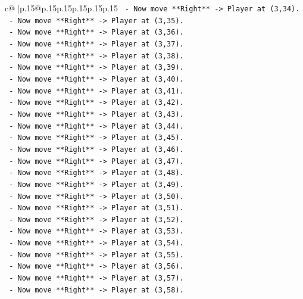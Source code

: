 \documentclass{article}
\begin{document}
{\begin{supertabular}{c@{$\;$}|p{.15\linewidth}@{}p{.15\linewidth}p{.15\linewidth}p{.15\linewidth}p{.15\linewidth}p{.15\linewidth}}
{{{\texttt{    {-}   Now move **Right** {-}> Player at (3,34).} \\
\texttt{    {-}   Now move **Right** {-}> Player at (3,35).} \\
\texttt{    {-}   Now move **Right** {-}> Player at (3,36).} \\
\texttt{    {-}   Now move **Right** {-}> Player at (3,37).} \\
\texttt{    {-}   Now move **Right** {-}> Player at (3,38).} \\
\texttt{    {-}   Now move **Right** {-}> Player at (3,39).} \\
\texttt{    {-}   Now move **Right** {-}> Player at (3,40).} \\
\texttt{    {-}   Now move **Right** {-}> Player at (3,41).} \\
\texttt{    {-}   Now move **Right** {-}> Player at (3,42).} \\
\texttt{    {-}   Now move **Right** {-}> Player at (3,43).} \\
\texttt{    {-}   Now move **Right** {-}> Player at (3,44).} \\
\texttt{    {-}   Now move **Right** {-}> Player at (3,45).} \\
\texttt{    {-}   Now move **Right** {-}> Player at (3,46).} \\
\texttt{    {-}   Now move **Right** {-}> Player at (3,47).} \\
\texttt{    {-}   Now move **Right** {-}> Player at (3,48).} \\
\texttt{    {-}   Now move **Right** {-}> Player at (3,49).} \\
\texttt{    {-}   Now move **Right** {-}> Player at (3,50).} \\
\texttt{    {-}   Now move **Right** {-}> Player at (3,51).} \\
\texttt{    {-}   Now move **Right** {-}> Player at (3,52).} \\
\texttt{    {-}   Now move **Right** {-}> Player at (3,53).} \\
\texttt{    {-}   Now move **Right** {-}> Player at (3,54).} \\
\texttt{    {-}   Now move **Right** {-}> Player at (3,55).} \\
\texttt{    {-}   Now move **Right** {-}> Player at (3,56).} \\
\texttt{    {-}   Now move **Right** {-}> Player at (3,57).} \\
\texttt{    {-}   Now move **Right** {-}> Player at (3,58).} \\
}}}
\end{supertabular}}
\end{document}
